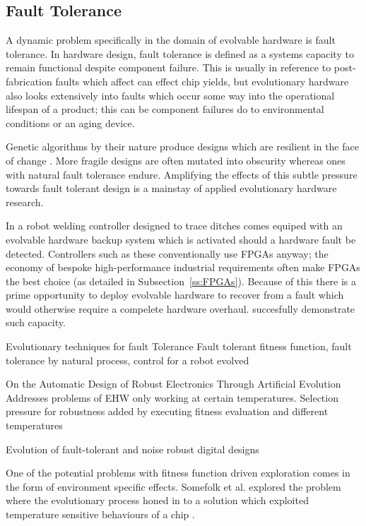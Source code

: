 \subsection{Fault Tolerance}

A dynamic problem specifically in the domain of evolvable hardware is fault
tolerance.
In hardware design, fault tolerance is defined as a systems capacity to
remain functional despite component failure. This is usually in reference to
post-fabrication faults which affect can effect chip yields, but evolutionary
hardware also looks extensively into faults which occur some way into the
operational lifespan of a product; this can be component failures do to environmental
conditions or an aging device.

Genetic algorithms by their nature produce designs which are resilient in the face
of change \cite{10.1007/3-540-46406-9_14}. More fragile designs are often
mutated into obscurity whereas ones with
natural fault tolerance endure. Amplifying the effects of this subtle pressure towards fault
tolerant design is a mainstay of applied evolutionary hardware research.

In \cite{10.1007/3-540-61093-6_6} a robot welding controller designed to trace
ditches comes equiped with an evolvable hardware backup system which is activated
should a hardware fault be detected. Controllers such as these conventionally use
FPGAs anyway; the economy of bespoke high-performance industrial requirements
often make FPGAs the best choice (as detailed in Subsection~\ref{ss:FPGAs}). Because of
this there is a prime opportunity to deploy evolvable hardware to recover from
a fault which would otherwise require a compelete hardware overhaul. \cite{10.1007/3-540-61093-6_6}
succesfully demonstrate such capacity.

\todo Evolutionary techniques for fault Tolerance\cite{651463}
Fault tolerant fitness function, fault tolerance by natural process, control for a robot evolved

\todo On the Automatic Design of Robust Electronics Through Artificial Evolution
Addresses problems of EHW only working at certain temperatures. Selection pressure
for robustness added by executing fitness evaluation and different temperatures

\todo Evolution of fault-tolerant and noise robust digital designs

One of the potential problems with fitness function driven exploration comes in
the form of environment specific effects. Somefolk et al. explored the problem
where the evolutionary process honed in to a solution which exploited temperature
sensitive behaviours of a chip \cite{10.1007/BFb0057603}.

